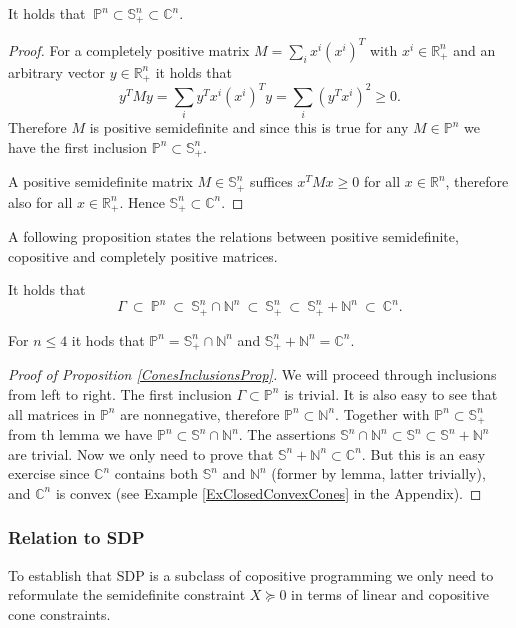 \documentclass[12pt]{book}
\theoremstyle{definition}
\begin{document}
\lema
\label{lemmaCPPSDPCP} It holds that  
$\ \mathbb{P}^n \subset \mathbb{S}^n_+ \subset \mathbb{C}^n. $ \rm
\begin{proof}
For a completely positive matrix $M=\sum_i x^i(x^i)^T$ with $x^i \in \mathbb{R}^n_+$ and an arbitrary vector $y\in\mathbb{R}^n_+$ it holds that 
$$ y^TMy = \sum_i y^Tx^i(x^i)^Ty = \sum_i (y^Tx^i)^2 \geq 0.$$
Therefore $M$ is positive semidefinite and since this is true for any $M\in \mathbb{P}^n$ we have the first inclusion $\mathbb{P}^n \subset \mathbb{S}^n_+$.

A positive semidefinite matrix $M\in\mathbb{S}^n_+$ suffices $x^TMx\geq 0$ for all $x\in \mathbb{R}^n$, therefore also 
for all $x\in \mathbb{R}^n_+$. Hence $ \mathbb{S}^n_+ \subset \mathbb{C}^n. $
\end{proof}

A following proposition states the relations between positive semidefinite, copositive and completely positive matrices.

\prop It holds that 
\label{ConesInclusionsProp}
$$\Gamma \ \subset \ \mathbb{P}^n \ \subset \ \mathbb{S}^n_+ \cap \mathbb{N}^n \ \subset \ \mathbb{S}^n_+ \ \subset \ \mathbb{S}^n_+ + \mathbb{N}^n \ \subset \ \mathbb{C}^n. $$ \rm

\rem For $n\leq 4$ it hods that $\mathbb{P}^n = \mathbb{S}^n_+ \cap \mathbb{N}^n$ and $\mathbb{S}^n_+ + \mathbb{N}^n = \mathbb{C}^n.$

\begin{proof}[Proof of Proposition \ref{ConesInclusionsProp}]
We will proceed through inclusions from left to right. The first inclusion $\Gamma\subset \mathbb{P}^n$ is trivial. It is also easy to see that all matrices in $\mathbb{P}^n$ are nonnegative, therefore $\mathbb{P}^n \subset \mathbb{N}^n$. Together with $\mathbb{P}^n \subset \mathbb{S}_+^n$ from th lemma we have $\mathbb{P}^n \subset \mathbb{S}^n \cap \mathbb{N}^n$. The assertions $\mathbb{S}^n \cap \mathbb{N}^n \subset \mathbb{S}^n \subset \mathbb{S}^n + \mathbb{N}^n$ are trivial. Now we only need to prove that $\mathbb{S}^n + \mathbb{N}^n\subset \mathbb{C}^n. $ But this is an easy exercise since $\mathbb{C}^n$ contains both $\mathbb{S}^n$ and $\mathbb{N}^n$ (former by lemma, latter trivially), and $\mathbb{C}^n$ is convex (see Example \ref{ExClosedConvexCones} in the Appendix).
\end{proof}




\subsubsection{Relation to SDP}
To establish that SDP is a subclass of copositive programming we only need to reformulate the semidefinite constraint $X\succeq 0$ in terms of linear and copositive cone constraints.
\end{document}
